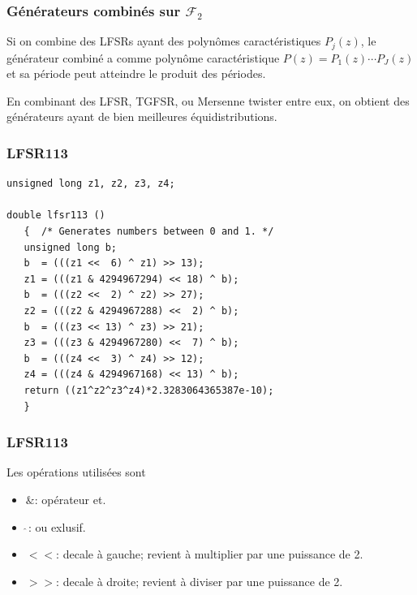 \documentclass[t,usepdftitle=false]{beamer}
\begin{document}
\begin{frame}
\frametitle{Générateurs combinés sur $\mathcal{F}_2$}

Si on combine des LFSRs ayant des polynômes caractéristiques $P_j(z)$,
le générateur combiné a comme polynôme caractéristique 
$P(z) = P_1(z)\cdots P_J(z)$ et sa période peut atteindre le produit
des périodes.

\mbox{}

En combinant des LFSR, TGFSR, ou Mersenne twister entre eux, on obtient 
des générateurs ayant de bien meilleures équidistributions.

\end{frame}

\begin{frame}[fragile]
\frametitle{LFSR113}

\begin{lstlisting}
unsigned long z1, z2, z3, z4;

double lfsr113 ()
   {  /* Generates numbers between 0 and 1. */
   unsigned long b;
   b  = (((z1 <<  6) ^ z1) >> 13);
   z1 = (((z1 & 4294967294) << 18) ^ b);
   b  = (((z2 <<  2) ^ z2) >> 27);
   z2 = (((z2 & 4294967288) <<  2) ^ b);
   b  = (((z3 << 13) ^ z3) >> 21);
   z3 = (((z3 & 4294967280) <<  7) ^ b);
   b  = (((z4 <<  3) ^ z4) >> 12);
   z4 = (((z4 & 4294967168) << 13) ^ b);
   return ((z1^z2^z3^z4)*2.3283064365387e-10);
   }
\end{lstlisting} 

\end{frame}

\begin{frame}[fragile]
\frametitle{LFSR113}

Les opérations utilisées sont
\begin{itemize}
\item
$\&$: opérateur et.
\item
$\hat{\ }$: ou exlusif.
\item
$<<$: decale à gauche; revient à multiplier par une puissance de 2.
\item
$>>$: decale à droite; revient à diviser par une puissance de 2. 
\end{itemize}

\end{frame}
\end{document}
